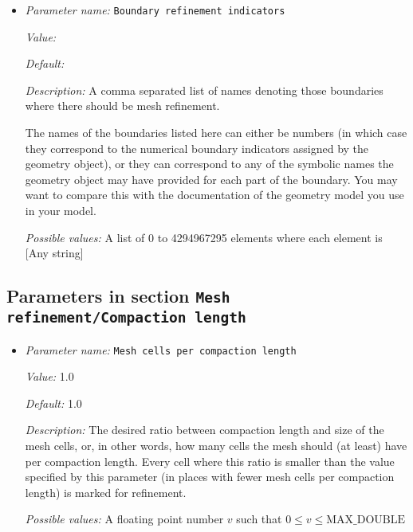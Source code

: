 \begin{itemize}
\item {\it Parameter name:} {\tt Boundary refinement indicators}
\label{parameters:Mesh refinement/Boundary/Boundary refinement indicators}


{\it Value:} 


{\it Default:} 


{\it Description:} A comma separated list of names denoting those boundaries where there should be mesh refinement.

The names of the boundaries listed here can either be numbers (in which case they correspond to the numerical boundary indicators assigned by the geometry object), or they can correspond to any of the symbolic names the geometry object may have provided for each part of the boundary. You may want to compare this with the documentation of the geometry model you use in your model.


{\it Possible values:} A list of 0 to 4294967295 elements where each element is [Any string]
\end{itemize}

\subsection{Parameters in section \tt Mesh refinement/Compaction length}
\label{parameters:Mesh_20refinement/Compaction_20length}

\begin{itemize}
\item {\it Parameter name:} {\tt Mesh cells per compaction length}
\label{parameters:Mesh refinement/Compaction length/Mesh cells per compaction length}


{\it Value:} 1.0


{\it Default:} 1.0


{\it Description:} The desired ratio between compaction length and size of the mesh cells, or, in other words, how many cells the mesh should (at least) have per compaction length. Every cell where this ratio is smaller than the value specified by this parameter (in places with fewer mesh cells per compaction length) is marked for refinement.


{\it Possible values:} A floating point number $v$ such that $0 \leq v \leq \text{MAX\_DOUBLE}$
\end{itemize}

